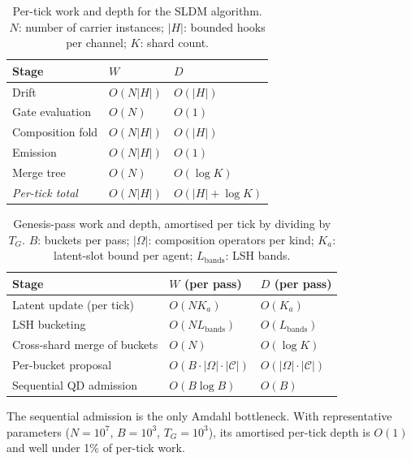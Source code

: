\documentclass[journal,onecolumn,11pt]{IEEEtran}
\theoremstyle{definition}
\begin{document}
\begin{table}[ht]
\centering
\caption{Per-tick work and depth for the SLDM algorithm. $N$: number of carrier instances; $|H|$: bounded hooks per channel; $K$: shard count.}
\label{tab:sldm-cost}
\small
\begin{tabularx}{\linewidth}{l l Y}
\toprule
Stage & $W$ & $D$ \\
\midrule
Drift                          & $O(N|H|)$                    & $O(|H|)$ \\
Gate evaluation                & $O(N)$                       & $O(1)$ \\
Composition fold               & $O(N|H|)$                    & $O(|H|)$ \\
Emission                       & $O(N|H|)$                    & $O(1)$ \\
Merge tree                     & $O(N)$                       & $O(\log K)$ \\
\midrule
\emph{Per-tick total}          & $O(N|H|)$                    & $O(|H| + \log K)$ \\
\bottomrule
\end{tabularx}
\end{table}

\begin{table}[ht]
\centering
\caption{Genesis-pass work and depth, amortised per tick by dividing by $T_G$. $B$: buckets per pass; $|\Omega|$: composition operators per kind; $K_a$: latent-slot bound per agent; $L_{\mathrm{bands}}$: LSH bands.}
\label{tab:sldm-genesis-cost}
\small
\begin{tabularx}{\linewidth}{l l Y}
\toprule
Stage & $W$ (per pass) & $D$ (per pass) \\
\midrule
Latent update (per tick)       & $O(N K_a)$                   & $O(K_a)$ \\
LSH bucketing                  & $O(N L_{\mathrm{bands}})$    & $O(L_{\mathrm{bands}})$ \\
Cross-shard merge of buckets   & $O(N)$                       & $O(\log K)$ \\
Per-bucket proposal            & $O(B \cdot |\Omega| \cdot |\mathcal{C}|)$ & $O(|\Omega| \cdot |\mathcal{C}|)$ \\
Sequential QD admission        & $O(B \log B)$                & $O(B)$ \\
\bottomrule
\end{tabularx}
\end{table}

The sequential admission is the only Amdahl bottleneck. With representative parameters ($N = 10^7$, $B = 10^3$, $T_G = 10^3$), its amortised per-tick depth is $O(1)$ and well under 1\% of per-tick work.
\end{document}
